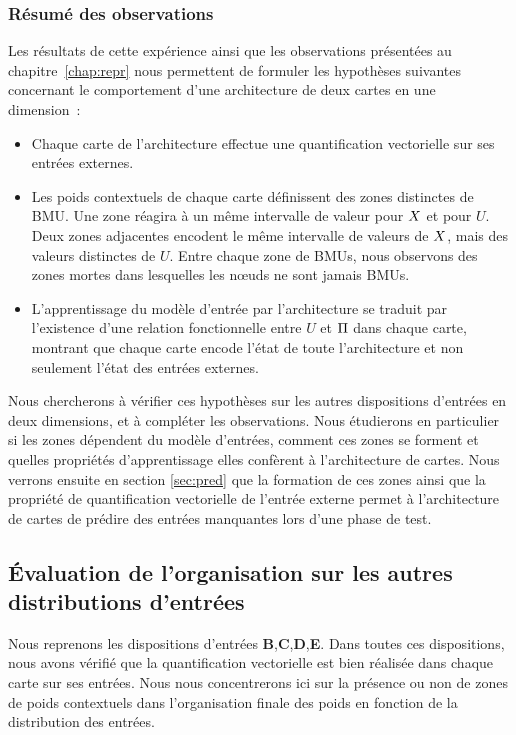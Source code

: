 \documentclass[../main]{subfiles}
\begin{document}
\subsubsection{Résumé des observations}

Les résultats de cette expérience ainsi que les observations présentées au chapitre~\ref{chap:repr} nous permettent de formuler les hypothèses suivantes concernant le comportement d'une architecture de deux cartes en une dimension~:

\begin{itemize}
	\item Chaque carte de l'architecture effectue une quantification vectorielle sur ses entrées externes.
	\item Les poids contextuels de chaque carte définissent des zones distinctes de BMU. 
	Une zone réagira à un même intervalle de valeur pour $X$ et pour $U$. Deux zones adjacentes encodent le même intervalle de valeurs de $X$, mais des valeurs distinctes de $U$.
	Entre chaque zone de BMUs, nous observons des zones mortes dans lesquelles les n\oe{}uds ne sont jamais BMUs. 
	\item L'apprentissage du modèle d'entrée par l'architecture se traduit par l'existence d'une relation fonctionnelle entre $U$ et $\Pi$ dans chaque carte, montrant que chaque carte encode l'état de toute l'architecture et non seulement l'état des entrées externes.
\end{itemize}

Nous chercherons à vérifier ces hypothèses sur les autres dispositions d'entrées en deux dimensions, et à compléter les observations.
Nous étudierons en particulier si les zones dépendent du modèle d'entrées, comment ces zones se forment et quelles propriétés d'apprentissage elles confèrent à l'architecture de cartes.
Nous verrons ensuite en section \ref{sec:pred} que la formation de ces zones ainsi que la propriété de quantification vectorielle de l'entrée externe permet à l'architecture de cartes de prédire des entrées manquantes lors d'une phase de test.

\subsection{\'Evaluation de l'organisation sur les autres distributions d'entrées}

Nous reprenons les dispositions d'entrées \textbf{B},\textbf{C},\textbf{D},\textbf{E}.
Dans toutes ces dispositions, nous avons vérifié que la quantification vectorielle est bien réalisée dans chaque carte sur ses entrées.
Nous nous concentrerons ici sur la présence ou non de zones de poids contextuels dans l'organisation finale des poids en fonction de la distribution des entrées.
\end{document}
